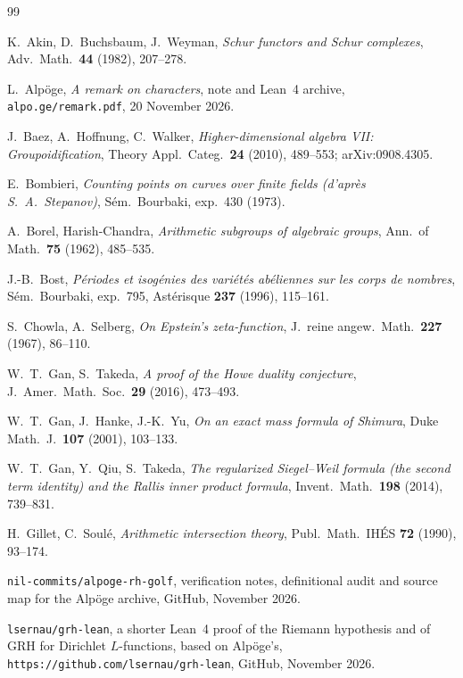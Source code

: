 \documentclass[11pt]{amsart}
\theoremstyle{definition}
\theoremstyle{remark}
\begin{document}
\begin{thebibliography}{99}\small

 K.~Akin, D.~Buchsbaum, J.~Weyman, \emph{Schur functors and Schur complexes}, Adv.\ Math.\ \textbf{44} (1982), 207--278.

 L.~Alp\"oge, \emph{A remark on characters}, note and Lean~4 archive, \texttt{alpo.ge/remark.pdf}, 20 November 2026.

 J.~Baez, A.~Hoffnung, C.~Walker, \emph{Higher-dimensional algebra VII: Groupoidification}, Theory Appl.\ Categ.\ \textbf{24} (2010), 489--553; arXiv:0908.4305.

 E.~Bombieri, \emph{Counting points on curves over finite fields (d'apr\`es S.~A.~Stepanov)}, S\'em.\ Bourbaki, exp.~430 (1973).

 A.~Borel, Harish-Chandra, \emph{Arithmetic subgroups of algebraic groups}, Ann.\ of Math.\ \textbf{75} (1962), 485--535.

 J.-B.~Bost, \emph{P\'eriodes et isog\'enies des vari\'et\'es ab\'eliennes sur les corps de nombres}, S\'em.\ Bourbaki, exp.~795, Ast\'erisque \textbf{237} (1996), 115--161.

 S.~Chowla, A.~Selberg, \emph{On Epstein's zeta-function}, J.\ reine angew.\ Math.\ \textbf{227} (1967), 86--110.

 W.~T.~Gan, S.~Takeda, \emph{A proof of the Howe duality conjecture}, J.\ Amer.\ Math.\ Soc.\ \textbf{29} (2016), 473--493.

 W.~T.~Gan, J.~Hanke, J.-K.~Yu, \emph{On an exact mass formula of Shimura}, Duke Math.\ J.\ \textbf{107} (2001), 103--133.

 W.~T.~Gan, Y.~Qiu, S.~Takeda, \emph{The regularized Siegel--Weil formula (the second term identity) and the Rallis inner product formula}, Invent.\ Math.\ \textbf{198} (2014), 739--831.

 H.~Gillet, C.~Soul\'e, \emph{Arithmetic intersection theory}, Publ.\ Math.\ IH\'ES \textbf{72} (1990), 93--174.

 \texttt{nil-commits/alpoge-rh-golf}, verification notes, definitional audit and source map for the Alp\"oge archive, GitHub, November 2026.

 \texttt{lsernau/grh-lean}, a shorter Lean~4 proof of the Riemann hypothesis and of GRH for Dirichlet $L$-functions, based on Alp\"oge's, \texttt{https://github.com/lsernau/grh-lean}, GitHub, November 2026.


\end{thebibliography}
\end{document}
